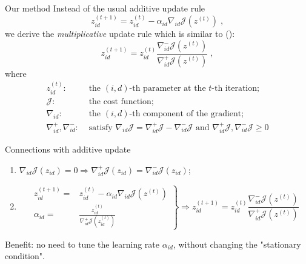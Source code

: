 \documentclass[first=dgreen,second=purple,logo=yellowexc]{aaltoslides}
\begin{document}
\begin{frame}{Our method}
Instead of the usual additive update rule
\[
z^{(t+1)}_{id}=z^{(t)}_{id}-\alpha_{id} \nabla_{id} \mathcal{J}(z^{(t)})\;,
\]
we derive the \emph{multiplicative} update rule which is similar to (\cite{yang10mlsp}):
\[
z^{(t+1)}_{id}=z^{(t)}_{id}\frac{\nabla^-_{id} \mathcal{J}(z^{(t)})}{\nabla^+_{id} \mathcal{J}(z^{(t)})}\;,
\]
where
\begin{align*}
z^{(t)}_{id}:&\mbox{ the $(i,d)$-th parameter at the $t$-th iteration;}\\
\mathcal{J}:&\mbox{ the cost function;}\\
\nabla_{id}:&\mbox{ the $(i,d)$-th component of the gradient;}\\
\nabla_{id}^+,\nabla_{id}^-:&\mbox{ satisfy }\nabla_{id}\mathcal{J}=\nabla_{id}^+\mathcal{J}-\nabla_{id}^-\mathcal{J}\mbox{ and }\nabla_{id}^+\mathcal{J},\nabla_{id}^-\mathcal{J}\ge 0
\end{align*}
\end{frame}

\begin{frame}{Connections with additive update}
\begin{enumerate}
\item $\nabla_{id}\mathcal{J}(z_{id})=0 \Longrightarrow \nabla_{id}^+\mathcal{J}(z_{id})=\nabla_{id}^-\mathcal{J}(z_{id})$;
\item
\[
\left.
\begin{aligned}
z^{(t+1)}_{id} =& z^{(t)}_{id}-\alpha_{id} \nabla_{id} \mathcal{J}(z^{(t)})\\
\alpha_{id} =& \frac{z_{id}^{(t)}}{\nabla_{id}^+\mathcal{J}(z_{id}^{(t)})}
\end{aligned}
\right\}\Longrightarrow z^{(t+1)}_{id}=z^{(t)}_{id}\frac{\nabla^-_{id} \mathcal{J}(z^{(t)})}{\nabla^+_{id} \mathcal{J}(z^{(t)})}
\]
\end{enumerate}
Benefit: no need to tune the learning rate $\alpha_{id}$, without changing the "stationary condition".
\end{frame}
\end{document}
